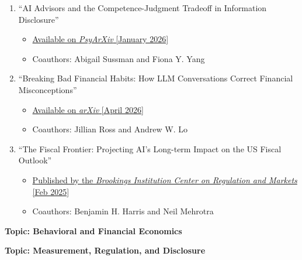 \documentclass[11pt]{article}
\begin{document}
\begin{enumerate}
\item ``AI Advisors and the Competence-Judgment Tradeoff in Information Disclosure''
\begin{itemize}
\vspace*{-.07in}
	\item \href{https://osf.io/preprints/psyarxiv/sejdg_v1}{Available on {\it PsyArXiv} [January 2026]}
\vspace*{-.07in}
	\item Coauthors: Abigail Sussman and Fiona Y. Yang
\end{itemize}
\vskip 0.24cm

\item ``Breaking Bad Financial Habits: How LLM Conversations Correct Financial Misconceptions''
\begin{itemize}
\vspace*{-.07in}
	\item \href{https://arxiv.org/abs/2604.27022}{Available on {\it arXiv} [April 2026]}
\vspace*{-.07in}
	\item Coauthors: Jillian Ross and Andrew W. Lo
\end{itemize}
\vskip 0.24cm

\item ``The Fiscal Frontier: Projecting AI's Long-term Impact on the US Fiscal Outlook''
\begin{itemize}
\vspace*{-.07in}
	\item \href{https://www.brookings.edu/articles/the-fiscal-frontier-projecting-ais-long-term-impact-on-the-us-fiscal-outlook/}{Published by the {\it Brookings Institution Center on Regulation and Markets} [Feb 2025]}
\vspace*{-.07in}
	\item Coauthors: Benjamin H. Harris and Neil Mehrotra
\end{itemize}

\end{enumerate}

\medskip
\vspace*{.2in}
{\bf Topic: Behavioral and Financial Economics} \\
\vspace*{-.2in}
\begin{enumerate}
    
\end{enumerate}

\medskip
\vspace*{.2in}
{\bf Topic: Measurement, Regulation, and Disclosure} \\
\vspace*{-.2in}
\begin{enumerate}
     
\end{enumerate}
\end{document}
